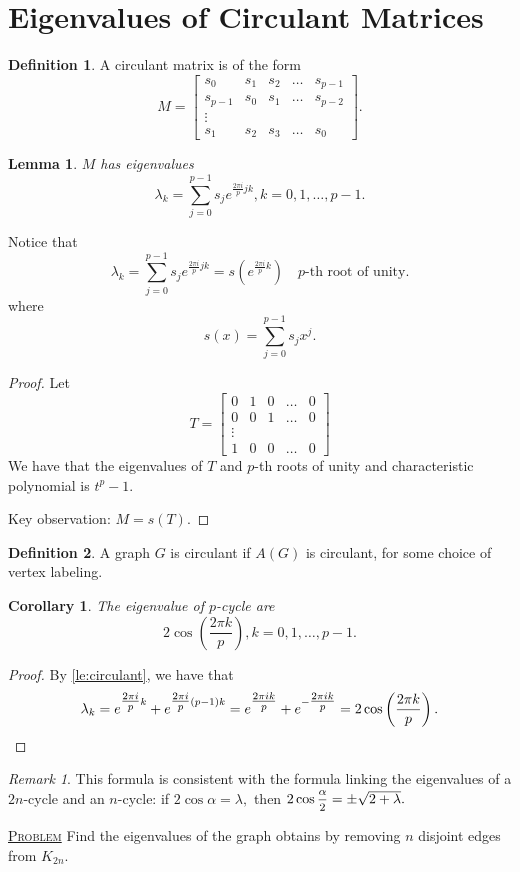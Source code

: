 \documentclass{report}
\newcommand{\fancyem}[1]{\underline{\textsc{#1}}}
\newtheorem{corollary}{Corollary}[section]
\newtheorem{lemma}{Lemma}[section]
\theoremstyle{definition}
\newtheorem{definition}{Definition}[section]
\theoremstyle{remark}
\newtheorem*{remark}{Remark}
\numberwithin{equation}{section}
\begin{document}
\section{Eigenvalues of Circulant Matrices}
\begin{definition}
A circulant matrix is of the form
\[
M = \begin{bmatrix}
s_0 & s_1 & s_2 & \ldots & s_{p-1} \\
s_{p-1} & s_0 & s_1 & \ldots & s_{p-2} \\
\vdots \\
s_1 & s_2 & s_3 & \ldots & s_0
\end{bmatrix}.
\]
\end{definition}

\begin{lemma}\label{le:circulant}
$M$ has eigenvalues \[\lambda_k = \sum_{j=0}^{p-1} s_je^{\tfrac{2\pi i}{p}jk}, k = 0, 1,\ldots, p-1.\]
\end{lemma}
Notice that
\[\lambda_k = \sum_{j=0}^{p-1} s_j e^{\tfrac{2\pi i}{p}jk} = s\left(e^{\tfrac{2\pi i}{p}k}\right) \quad \text{$p$-th root of unity}.\]
where \[s(x) = \sum_{j=0}^{p-1} s_j x^j.\]

\begin{proof}
Let \[
T = \begin{bmatrix}
0 & 1 & 0 & \ldots & 0 \\
0 & 0 & 1 & \ldots & 0 \\
\vdots \\
1 & 0 & 0 & \ldots & 0
\end{bmatrix}
\]
We have that the eigenvalues of $T$ and $p$-th roots of unity and characteristic polynomial is $t^p - 1.$

Key observation:
$M = s(T).$
\end{proof}

\begin{definition}
A graph $G$ is circulant if $A(G)$ is circulant, for some choice of vertex labeling.
\end{definition}
\begin{corollary}
The eigenvalue of $p$-cycle are 
\[2\cos\left(\frac{2\pi k}{p}\right), k = 0, 1, \ldots, p - 1.\]
\end{corollary}

\begin{proof}
By \autoref{le:circulant}, we have that
\[\lambda_k = e^{\tfrac{2 \pi i}{p}k} + e^{\tfrac{2 \pi i}{p}(p - 1)k} = e^{\tfrac{2 \pi ik}{p}} + e^{-\tfrac{2 \pi i k}{p}} = 2\cos\left(\frac{2\pi k}{p}\right). \qedhere\]
\end{proof}
\begin{remark}
This formula is consistent with the formula linking the eigenvalues of a $2n$-cycle and an $n$-cycle: if $2\cos\alpha = \lambda,$ then $2\cos\mfrac{\alpha}{2} = \pm\sqrt{2 + \lambda}.$
\end{remark}
\fancyem{Problem} Find the eigenvalues of the graph obtains by removing $n$ disjoint edges from $K_{2n}.$
\end{document}

